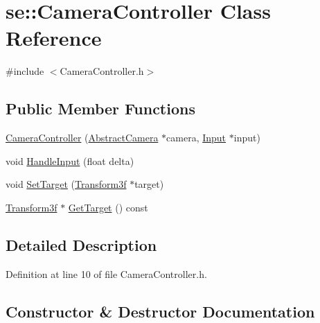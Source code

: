 \hypertarget{classse_1_1_camera_controller}{}\section{se\+:\+:Camera\+Controller Class Reference}
\label{classse_1_1_camera_controller}


{\ttfamily \#include $<$Camera\+Controller.\+h$>$}

\subsection*{Public Member Functions}
\begin{DoxyCompactItemize}
\item 
\mbox{\hyperlink{classse_1_1_camera_controller_a6dd7d1310527946f84729414b547ce5a}{Camera\+Controller}} (\mbox{\hyperlink{classse_1_1_abstract_camera}{Abstract\+Camera}} $\ast$camera, \mbox{\hyperlink{classse_1_1_input}{Input}} $\ast$input)
\item 
void \mbox{\hyperlink{classse_1_1_camera_controller_ab6bbdc5adfe20a96d28a53258e5de1a6}{Handle\+Input}} (float delta)
\item 
void \mbox{\hyperlink{classse_1_1_camera_controller_a7b9d137e927ce64aae6af3f21c64f1d5}{Set\+Target}} (\mbox{\hyperlink{classse_1_1_transform3f}{Transform3f}} $\ast$target)
\item 
\mbox{\hyperlink{classse_1_1_transform3f}{Transform3f}} $\ast$ \mbox{\hyperlink{classse_1_1_camera_controller_a5b63115409d37fd1aa893e27bb2444a3}{Get\+Target}} () const
\end{DoxyCompactItemize}


\subsection{Detailed Description}


Definition at line 10 of file Camera\+Controller.\+h.



\subsection{Constructor \& Destructor Documentation}
\mbox{\label{classse_1_1_camera_controller_a6dd7d1310527946f84729414b547ce5a}} 
